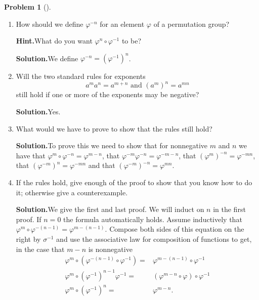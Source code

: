 \documentclass[10pt,]{book}
\theoremstyle{plain}
\theoremstyle{definition}
\newtheorem{activity}[project]{Problem}
\theoremstyle{definition}
\numberwithin{equation}{chapter}
\newcommand{\amp}{&}
\begin{document}
\begin{activity}[]\label{activity-253}
\leavevmode%
\begin{enumerate}[font=\bfseries,label=(\alph*),ref=\alph*]
\item\label{task-182} How should we define \(\varphi^{-n}\) for an element \(\varphi\) of a permutation group?%
\par\medskip\noindent%
\textbf{Hint.}\quad What do you want \(\varphi^n\circ\varphi^{-1}\) to be?%
\par\medskip\noindent%
\textbf{Solution.}\quad We define \(\varphi^{-n}=\left(\varphi^{-1}\right)^n\).%
\item\label{task-183} Will the two standard rules for exponents%
\begin{equation*}
a^ma^n=a^{m+n} \mbox{\ and\ }  (a^m)^n = a^{mn}
\end{equation*}
still hold if one or more of the exponents may be negative?%
\par\medskip\noindent%
\textbf{Solution.}\quad Yes.%
\item\label{task-184} What would we have to prove to show that the rules still hold?%
\par\medskip\noindent%
\textbf{Solution.}\quad To prove this we need to show that for nonnegative \(m\) and \(n\) we have that \(\varphi^m\circ\varphi^{-n} =
\varphi^{m-n}\), that \(\varphi^{-m}\varphi^{-n} = \varphi^{-m-n}\), that \((\varphi^m)^{-n} = \varphi^{-mn}\), that \((\varphi^{-m})^n = \varphi^{-mn}\) and that \((\varphi^{-m})^{-n}= \varphi^{mn}\).%
\item\label{task-185} If the rules hold, give enough of the proof to show that you know how to do it; otherwise give a counterexample.%
\par\medskip\noindent%
\textbf{Solution.}\quad We give the first and last proof. We will induct on \(n\) in the first proof. If \(n=0\) the formula automatically holds. Assume inductively that \(\varphi^m\circ\varphi^{-(n-1)} = \varphi^{m-(n-1)}\). Compose both sides of this equation on the right by \(\sigma^{-1}\) and use the associative law for composition of functions to get, in the case that \(m-n\) is nonnegative%
\begin{align*}
\varphi^m\circ(\varphi^{-(n-1)}\circ\varphi^{-1})  =\amp
\varphi^{m-(n-1)}\circ\varphi^{-1}\\
\varphi^m\circ(\varphi^{-1})^{n-1}\varphi^{-1} =\amp
(\varphi^{m-n}\circ\varphi)\circ\varphi^{-1}\\
\varphi^m\circ(\varphi^{-1})^n  =\amp  \varphi^{m-n}.
\end{align*}

\end{enumerate}
\end{activity}
\end{document}
